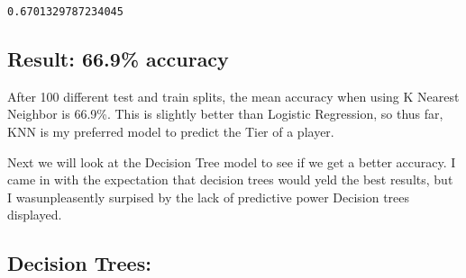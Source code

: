 \documentclass[11pt]{article}
\begin{document}
    \begin{Verbatim}[commandchars=\\\{\}]
0.6701329787234045

    \end{Verbatim}

    \subsection{Result: 66.9\% accuracy}\label{result-66.9-accuracy}

After 100 different test and train splits, the mean accuracy when using
K Nearest Neighbor is 66.9\%. This is slightly better than Logistic
Regression, so thus far, KNN is my preferred model to predict the Tier
of a player.

Next we will look at the Decision Tree model to see if we get a better
accuracy. I came in with the expectation that decision trees would yeld
the best results, but I wasunpleasently surpised by the lack of
predictive power Decision trees displayed. 

    \subsection{Decision Trees:}\label{decision-trees}
\end{document}
